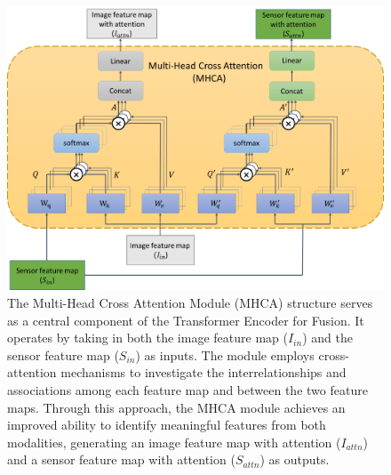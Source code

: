\documentclass[acmsmall,manuscript, screen, review]{acmart}
\begin{document}
\begin{figure}[htbp]
  \centering
  \includegraphics[width=0.8\linewidth]{pic/cross_attention.png}
  \caption{The Multi-Head Cross Attention Module (MHCA) structure serves as a central component of the Transformer Encoder for Fusion. It operates by taking in both the image feature map (\begin{math}
    I_{in}
  \end{math}) and the sensor feature map (\begin{math}
    S_{in}
  \end{math}) as inputs. The module employs cross-attention mechanisms to investigate the interrelationships and associations among each feature map and between the two feature maps. Through this approach, the MHCA module achieves an improved ability to identify meaningful features from both modalities, generating an image feature map with attention (\begin{math}
    I_{attn}
  \end{math}) and a sensor feature map with attention (\begin{math}
    S_{attn}
  \end{math}) as outputs.}
  \label{cross_attention}
\end{figure}
\end{document}
